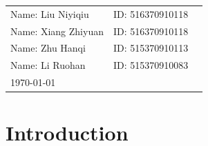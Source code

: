 \documentclass[12pt,a4paper]{article}
\begin{document}
\vspace*{0.25cm}

\hrulefill

\thispagestyle{empty}

\begin{center}
\begin{large}
\end{large}

\hrulefill

\vspace*{5cm}
\begin{Large}
\end{Large}

\vspace{2em}

\begin{large}
\end{large}
\end{center}


\vfill

\begin{table}[h!]
\flushleft
\begin{tabular}{lll}
Name: Liu Niyiqiu \hspace*{2em}&
ID: 516370910118\hspace*{2em}
\\
Name: Xiang Zhiyuan \hspace*{2em}&
ID: 516370910118\hspace*{2em}
\\
Name: Zhu Hanqi \hspace*{2em}&
ID: 515370910113\hspace*{2em}
\\
Name: Li Ruohan \hspace*{2em}&
ID: 515370910083\hspace*{2em}
\\

\today
\end{tabular}
\end{table}

\hfill

\newpage
\tableofcontents
\newpage
\section{Introduction}
\end{document}
